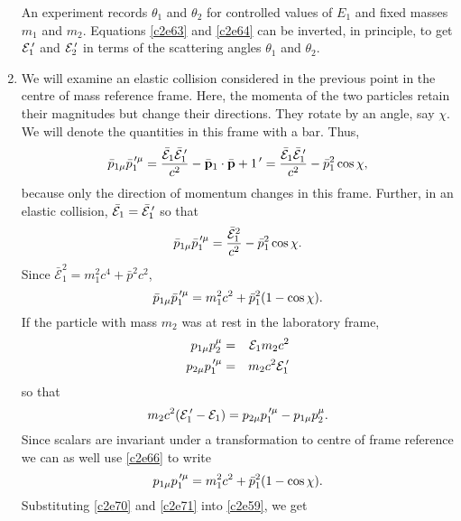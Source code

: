 \begin{enumerate}
An experiment records $\theta_1$ and $\theta_2$ for controlled values of $E_1$
and fixed masses $m_1$ and $m_2$. Equations \eqref{c2e63} and \eqref{c2e64}
can be inverted, in principle, to get $\mathcal{E}_1^{\,\prime}$ and $\mathcal{E}_2^{\,\prime}$ in terms of
the scattering angles $\theta_1$ and $\theta_2$.

\item We will examine an elastic collision considered in the previous point in 
the centre of mass reference frame. Here, the momenta of the two particles retain
their magnitudes but change their directions. They rotate by an angle, say $\chi$.
We will denote the quantities in this frame with a bar. Thus,
\begin{equation}\label{c2e65}
\bar{p}_{1\mu}\bar{p}_1^{{\,\prime}\mu} = \frac{\bar{\mathcal{E}}_1\bar{\mathcal{E}}_1^{\,\prime}}{c^2} - 
\bar{\mathbf{p}}_1\cdot\bar{\mathbf{p}}+1^{\,\prime} = \frac{\bar{\mathcal{E}}_1\bar{\mathcal{E}}_1^{\,\prime}}{c^2} - 
\bar{p}^2_1\cos\chi,
\end{equation}
because only the direction of momentum changes in this frame. Further, in an
elastic collision, $\bar{\mathcal{E}}_1 = \bar{\mathcal{E}}_1^{\,\prime}$ so that
\begin{equation}\label{c2e66}
\bar{p}_{1\mu}\bar{p}_1^{{\,\prime}\mu} = \frac{\bar{\mathcal{E}}_1^2}{c^2} - \bar{p}_1^2\cos\chi.
\end{equation}
Since $\bar{\mathcal{E}}_1^2 = m_1^2c^4 + \bar{p}^2c^2$, 
\begin{equation}\label{c2e67}
\bar{p}_{1\mu}\bar{p}_1^{{\,\prime}\mu} = m_1^2c^2 + \bar{p}_1^2(1 - \cos\chi).
\end{equation}
If the particle with mass $m_2$ was at rest in the laboratory frame,
\begin{eqnarray}
p_{1\mu}p_2^\mu &=& \mathcal{E}_1m_2c^2 \label{c2e68} \\
p_{2\mu}p_1^{{\,\prime}\mu} &=& m_2c^2 \mathcal{E}_1^{\,\prime} \label{c2e69}
\end{eqnarray}
so that
\begin{equation}\label{c2e70}
m_2c^2(\mathcal{E}_1^{\,\prime} - \mathcal{E}_1) = p_{2\mu}p_1^{{\,\prime}\mu} - p_{1\mu}p_2^\mu.
\end{equation}
Since scalars are invariant under a transformation to centre of frame reference
we can as well use \eqref{c2e66} to write
\begin{equation}\label{c2e71}
p_{1\mu}p_1^{{\,\prime}\mu} = m_1^2c^2 + \bar{p}_1^2(1 - \cos\chi).
\end{equation}
Substituting \eqref{c2e70} and \eqref{c2e71} into \eqref{c2e59}, we get
\begin{equation}\label{c2e72}

\end{equation}
\end{enumerate}
